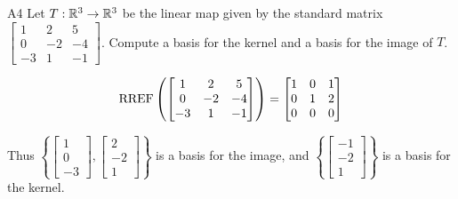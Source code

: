 \begin{problem}{A4}
Let $T: \mathbb{R}^3 \rightarrow \mathbb{R}^3$ be the linear map given by the standard matrix
\(
  \begin{bmatrix}
    1 & 2 & 5 \\
    0 & -2 & -4 \\
    -3 & 1 & -1
  \end{bmatrix}
\). Compute a basis for the kernel and a basis for the image of $T$.
\end{problem}
\begin{solution}
\[
  \operatorname{RREF} \left( \begin{bmatrix}
    1 & 2 & 5 \\
    0 & -2 & -4 \\
    -3 & 1 & -1
  \end{bmatrix} \right) = \begin{bmatrix}
    1 & 0 & 1 \\
    0 & 1 & 2 \\
    0 & 0 & 0
  \end{bmatrix}
\]

Thus \(\left\{
  \begin{bmatrix} 1 \\ 0 \\ -3 \end{bmatrix},
  \begin{bmatrix} 2 \\ -2 \\ 1 \end{bmatrix}
\right\} \) is a basis for the image, and \(\left\{
  \begin{bmatrix} -1 \\ -2 \\ 1 \end{bmatrix}
\right\} \) is a basis for the kernel.
\end{solution}


